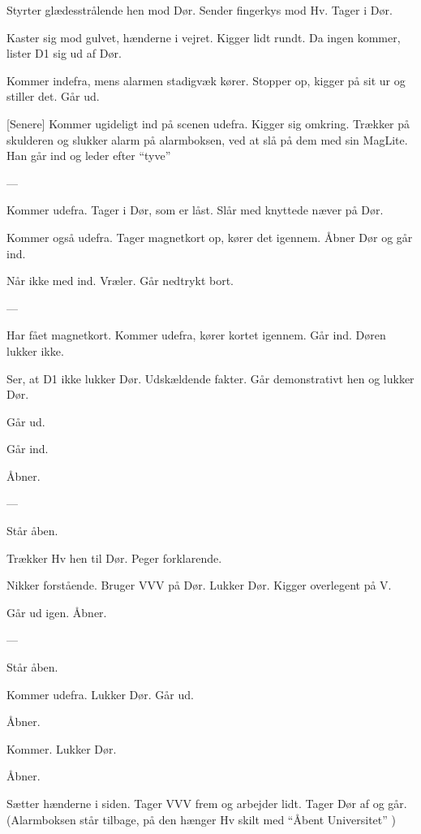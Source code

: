 \documentclass[danish]{article}
\begin{document}
\begin{sketch}
 Styrter glædesstrålende hen mod Dør. Sender fingerkys mod Hv.  Tager i
Dør.


 Kaster sig mod gulvet, hænderne i vejret. Kigger lidt rundt. Da ingen
kommer, lister D1 sig ud af Dør.

 Kommer indefra, mens alarmen stadigvæk kører. Stopper op, kigger på sit ur og stiller det. Går ud.

[Senere] Kommer ugideligt ind på scenen udefra. Kigger sig omkring. Trækker på
skulderen og slukker alarm på alarmboksen, ved at slå på dem med sin MagLite. Han går ind og leder efter ``tyve''

---

 Kommer udefra. Tager i Dør, som er låst. Slår med knyttede næver på
Dør.

 Kommer også udefra. Tager magnetkort op, kører det igennem. Åbner Dør
og går ind.

 Når ikke med ind. Vræler. Går nedtrykt bort.

---

 Har fået magnetkort. Kommer udefra, kører kortet igennem. Går ind. Døren
lukker ikke.

 Ser, at D1 ikke lukker Dør. Udskældende fakter. Går demonstrativt hen
og lukker Dør.

 Går ud.

 Går ind.


 Åbner.

---

 Står åben.

 Trækker Hv hen til Dør. Peger forklarende.

 Nikker forstående. Bruger VVV på Dør. Lukker Dør. Kigger overlegent på
V.

 Går ud igen.
 Åbner.

---

 Står åben.

 Kommer udefra. Lukker Dør. Går ud.

 Åbner.

 Kommer. Lukker Dør.

 Åbner.

 Sætter hænderne i siden. Tager VVV frem og arbejder lidt. Tager Dør af
og går. (Alarmboksen står tilbage, på den hænger Hv skilt med ``Åbent Universitet'' )


\end{sketch}
\end{document}
